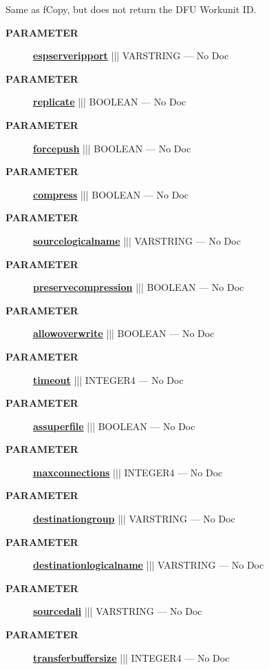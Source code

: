 \par





Same as fCopy, but does not return the DFU Workunit ID.






\par
\begin{description}
\item [\colorbox{tagtype}{\color{white} \textbf{\textsf{PARAMETER}}}] \textbf{\underline{espserveripport}} ||| VARSTRING --- No Doc
\item [\colorbox{tagtype}{\color{white} \textbf{\textsf{PARAMETER}}}] \textbf{\underline{replicate}} ||| BOOLEAN --- No Doc
\item [\colorbox{tagtype}{\color{white} \textbf{\textsf{PARAMETER}}}] \textbf{\underline{forcepush}} ||| BOOLEAN --- No Doc
\item [\colorbox{tagtype}{\color{white} \textbf{\textsf{PARAMETER}}}] \textbf{\underline{compress}} ||| BOOLEAN --- No Doc
\item [\colorbox{tagtype}{\color{white} \textbf{\textsf{PARAMETER}}}] \textbf{\underline{sourcelogicalname}} ||| VARSTRING --- No Doc
\item [\colorbox{tagtype}{\color{white} \textbf{\textsf{PARAMETER}}}] \textbf{\underline{preservecompression}} ||| BOOLEAN --- No Doc
\item [\colorbox{tagtype}{\color{white} \textbf{\textsf{PARAMETER}}}] \textbf{\underline{allowoverwrite}} ||| BOOLEAN --- No Doc
\item [\colorbox{tagtype}{\color{white} \textbf{\textsf{PARAMETER}}}] \textbf{\underline{timeout}} ||| INTEGER4 --- No Doc
\item [\colorbox{tagtype}{\color{white} \textbf{\textsf{PARAMETER}}}] \textbf{\underline{assuperfile}} ||| BOOLEAN --- No Doc
\item [\colorbox{tagtype}{\color{white} \textbf{\textsf{PARAMETER}}}] \textbf{\underline{maxconnections}} ||| INTEGER4 --- No Doc
\item [\colorbox{tagtype}{\color{white} \textbf{\textsf{PARAMETER}}}] \textbf{\underline{destinationgroup}} ||| VARSTRING --- No Doc
\item [\colorbox{tagtype}{\color{white} \textbf{\textsf{PARAMETER}}}] \textbf{\underline{destinationlogicalname}} ||| VARSTRING --- No Doc
\item [\colorbox{tagtype}{\color{white} \textbf{\textsf{PARAMETER}}}] \textbf{\underline{sourcedali}} ||| VARSTRING --- No Doc
\item [\colorbox{tagtype}{\color{white} \textbf{\textsf{PARAMETER}}}] \textbf{\underline{transferbuffersize}} ||| INTEGER4 --- No Doc
\end{description}







